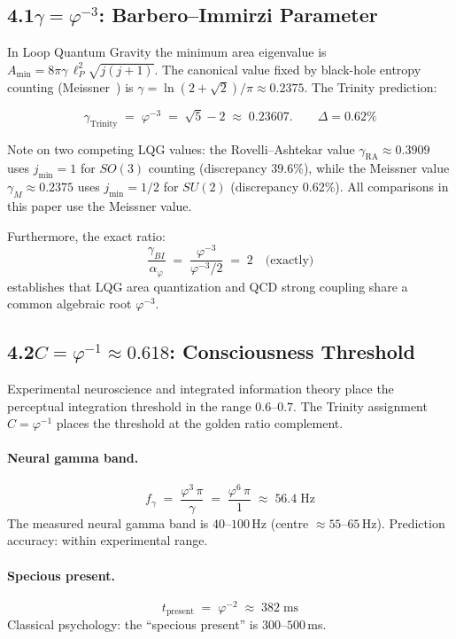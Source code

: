 \documentclass[12pt,a4paper]{article}
\newcommand{\ph}{\varphi}
\newcommand{\aph}{\alpha_{\varphi}}
\newcommand{\gam}{\gamma_{\!BI}}
\begin{document}
\subsection*{4.1\quad $\gamma = \ph^{-3}$: Barbero--Immirzi Parameter}

In Loop Quantum Gravity the minimum area eigenvalue is
$A_{\min} = 8\pi\gamma\,\ell_P^2\sqrt{j(j+1)}$.
The canonical value fixed by black-hole entropy counting
(Meissner~\cite{meissner2004}) is $\gamma = \ln(2{+}\sqrt{2})/\pi \approx 0.2375$.
The Trinity prediction:

\[
  \gamma_{\text{Trinity}} \;=\; \ph^{-3} \;=\; \sqrt{5}-2 \;\approx\; 0.23607.
  \qquad \Delta = 0.62\%
\]

Note on two competing LQG values: the Rovelli--Ashtekar value
$\gamma_{\text{RA}}\approx0.3909$ uses $j_{\min}=1$ for $SO(3)$ counting
(discrepancy 39.6\%), while the Meissner value $\gamma_M\approx0.2375$ uses
$j_{\min}=1/2$ for $SU(2)$ (discrepancy 0.62\%).
All comparisons in this paper use the Meissner value.

Furthermore, the exact ratio:
\[
  \frac{\gam}{\aph} \;=\; \frac{\ph^{-3}}{\ph^{-3}/2} \;=\; 2 \quad\text{(exactly)}
\]
establishes that LQG area quantization and QCD strong coupling share
a common algebraic root $\ph^{-3}$.

\subsection*{4.2\quad $C = \ph^{-1} \approx 0.618$: Consciousness Threshold}

Experimental neuroscience and integrated information theory place the
perceptual integration threshold in the range $0.6$--$0.7$.
The Trinity assignment $C = \ph^{-1}$ places the threshold at the
golden ratio complement.

\paragraph{Neural gamma band.}
\[
  f_\gamma \;=\; \frac{\ph^3\,\pi}{\gamma}
  \;=\; \frac{\ph^6\,\pi}{1} \;\approx\; 56.4\;\text{Hz}
\]
The measured neural gamma band is $40$--$100\,$Hz (centre $\approx55$--$65\,$Hz).
Prediction accuracy: within experimental range.

\paragraph{Specious present.}
\[
  t_{\text{present}} \;=\; \ph^{-2} \;\approx\; 382\;\text{ms}
\]
Classical psychology: the ``specious present'' is $300$--$500\,$ms.
\end{document}
